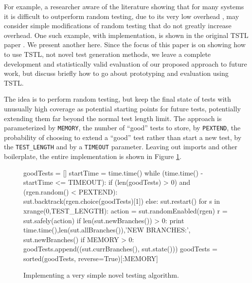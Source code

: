 For example, a researcher aware of the literature showing that for many systems it is difficult to outperform random testing, due to its very low overhead \cite{ISSRE12,ISSTA12}, may consider simple modifications of random testing that do not greatly increase overhead.  One such example, with implementation, is shown in the original TSTL paper \cite{NFM15}.  We present another here.  Since the focus of this paper is on showing how to use TSTL, not novel test generation methods, we leave a complete development and statistically valid evaluation of our proposed approach to future work, but discuss briefly how to go about prototyping and evaluation using TSTL.

The idea is to perform random testing, but keep the final state of tests with unusually high coverage as potential starting points for future tests, potentially extending them far beyond the normal test length limit.  The approach is parameterized by {\tt MEMORY}, the number of ``good'' tests to store, by {\tt PEXTEND}, the probability of choosing to extend a ``good'' test rather than start a new test, by the {\tt TEST\_LENGTH} and by a {\tt TIMEOUT} parameter.  Leaving out imports and other boilerplate, the entire implementation is shown in Figure \ref{fig:keepgood}.

\begin{figure}
{\scriptsize
\begin{code}
goodTests = []
startTime = time.time()
while (time.time() - startTime <= TIMEOUT):
   if (len(goodTests) > 0) and (rgen.random() < PEXTEND):
     sut.backtrack(rgen.choice(goodTests)[1])
   else:
     sut.restart()
   for s in xrange(0,TEST\_LENGTH): 
      action = sut.randomEnabled(rgen)
      r = sut.safely(action)
      if len(sut.newBranches()) > 0:
         print time.time(),len(sut.allBranches()),'NEW BRANCHES:', sut.newBranches()
   if MEMORY > 0:
      goodTests.append((sut.currBranches(), sut.state()))
      goodTests = sorted(goodTests, reverse=True)[:MEMORY]
\end{code}
}
\caption{Implementing a very simple novel testing algorithm.}
\label{fig:keepgood}
\end{figure}

